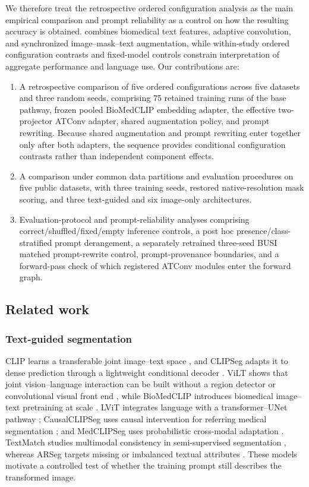 We therefore treat the retrospective ordered configuration analysis as the main
empirical comparison and prompt reliability as a control on how the resulting
accuracy is obtained. \methodname{} combines biomedical text features,
adaptive convolution, and synchronized image--mask--text augmentation, while
within-study ordered configuration contrasts and fixed-model controls constrain
interpretation of aggregate performance and language use. Our contributions are:
\begin{enumerate}
  \item A retrospective comparison of five ordered configurations across five
  datasets and three random seeds, comprising 75 retained training runs of the base
  pathway, frozen pooled BioMedCLIP embedding adapter, the effective
  two-projector ATConv adapter, shared augmentation policy, and prompt rewriting.
  Because shared augmentation and prompt rewriting enter together only after both
  adapters, the sequence provides
  conditional configuration contrasts rather than independent component effects.
  \item A comparison under common data partitions and evaluation procedures on
  five public datasets, with three training seeds, restored native-resolution
  mask scoring, and three
  text-guided and six image-only architectures.
  \item Evaluation-protocol and prompt-reliability analyses comprising
  correct/shuffled/fixed/empty inference controls,
  a post hoc presence/class-stratified prompt derangement,
  a separately retrained three-seed BUSI matched prompt-rewrite control,
  prompt-provenance boundaries, and a forward-pass check of which registered ATConv
  modules enter the forward graph.
\end{enumerate}

\subsection{Related work}
\subsubsection{Text-guided segmentation}
CLIP learns a transferable joint image--text space \cite{radford2021clip}, and
CLIPSeg adapts it to dense prediction through a lightweight conditional decoder
\cite{clipseg}. ViLT shows that joint vision--language interaction can be built
without a region detector or convolutional visual front end \cite{vilt}, while
BioMedCLIP introduces biomedical image--text pretraining at scale
\cite{biomedclip}. LViT integrates language with a transformer--UNet pathway
\cite{lvit}; CausalCLIPSeg uses causal intervention for referring medical
segmentation \cite{causalclipseg}; and MedCLIPSeg uses probabilistic cross-modal
adaptation \cite{medclipseg}. TextMatch studies multimodal consistency in
semi-supervised segmentation \cite{textmatch}, whereas ARSeg targets missing or
imbalanced textual attributes \cite{arseg}. These models motivate a controlled
test of whether the training prompt still describes the transformed image.

